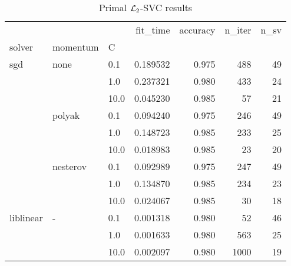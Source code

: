 \begin{table}[H]
\centering
\caption{Primal $\protect \mathcal{L}_2$-SVC results}
\label{primal_l2_svc_cv_results}
\begin{tabular}{lllrrrr}
\toprule
          &   &      &  fit\_time &  accuracy &  n\_iter &  n\_sv \\
solver & momentum & C &           &           &         &       \\
\midrule
sgd & none & 0.1  &  0.189532 &     0.975 &     488 &    49 \\
          &   & 1.0  &  0.237321 &     0.980 &     433 &    24 \\
          &   & 10.0 &  0.045230 &     0.985 &      57 &    21 \\
          & polyak & 0.1  &  0.094240 &     0.975 &     246 &    49 \\
          &   & 1.0  &  0.148723 &     0.985 &     233 &    25 \\
          &   & 10.0 &  0.018983 &     0.985 &      23 &    20 \\
          & nesterov & 0.1  &  0.092989 &     0.975 &     247 &    49 \\
          &   & 1.0  &  0.134870 &     0.985 &     234 &    23 \\
          &   & 10.0 &  0.024067 &     0.985 &      30 &    18 \\
liblinear & - & 0.1  &  0.001318 &     0.980 &      52 &    46 \\
          &   & 1.0  &  0.001633 &     0.980 &     563 &    25 \\
          &   & 10.0 &  0.002097 &     0.980 &    1000 &    19 \\
\bottomrule
\end{tabular}
\end{table}
